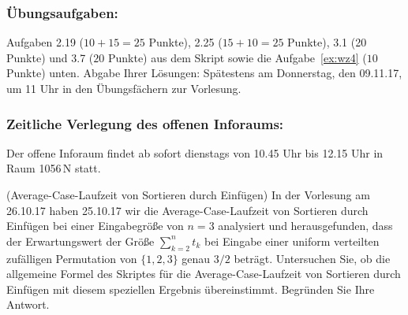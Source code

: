 {}

\subsubsection{\"Ubungsaufgaben:}
Aufgaben 2.19 ($10+15=25$ Punkte),
2.25 ($15+10=25$ Punkte),
3.1 (20 Punkte)
und
3.7 ($20$ Punkte) aus dem Skript
sowie die Aufgabe~\ref{ex:wz4} ($10$
Punkte) unten.
Abgabe Ihrer L\"osungen:
Sp\"atestens am Donnerstag, den 09.11.17,
um 11 Uhr in den \"Ubungsf\"achern
zur Vorlesung.

\subsubsection{Zeitliche Verlegung des offenen Inforaums:}
Der offene Inforaum findet ab sofort dienstags von
10.45 Uhr bis 12.15 Uhr in
Raum 1056$\,$N statt.

\begin{Twproblem}{(Average-Case-Laufzeit von
Sortieren durch Einf\"ugen)}
\label{ex:wz4}%
In der Vorlesung am 26.10.17 haben 25.10.17 wir die
Average-Case-Laufzeit von
Sortieren durch Einf\"ugen bei einer
Eingabegr\"o\ss e von $n=3$ analysiert
und herausgefunden, dass der Erwartungswert der
Gr\"o\ss e $\sum_{k=2}^n t_k$ bei Eingabe
einer uniform verteilten zuf\"alligen
Permutation von $\{1,2,3\}$ genau
$3/2$ betr\"agt.
Untersuchen Sie, ob die allgemeine Formel
des Skriptes f\"ur die
Average-Case-Laufzeit von
Sortieren durch Einf\"ugen mit diesem
speziellen Ergebnis \"ubereinstimmt.
Begr\"unden Sie Ihre Antwort.
\end{Twproblem}
